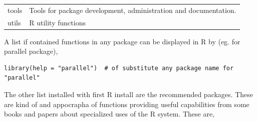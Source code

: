 \documentclass[]{book}
\theoremstyle{definition}
\theoremstyle{definition}
\theoremstyle{definition}
\theoremstyle{remark}
\begin{document}
\begin{longtable}[]{@{}ll@{}}
\begin{minipage}[t]{0.13\columnwidth}
tools\strut
\end{minipage} & \begin{minipage}[t]{0.81\columnwidth}\raggedright\strut
Tools for package development, administration and documentation.\strut
\end{minipage}\tabularnewline
\begin{minipage}[t]{0.13\columnwidth}\raggedright\strut
utils\strut
\end{minipage} & \begin{minipage}[t]{0.81\columnwidth}\raggedright\strut
R utility functions\strut
\end{minipage}\tabularnewline
\bottomrule
\end{longtable}

A list if contained functions in any package can be displayed in R by
(eg. for parallel package),

\begin{verbatim}
library(help = "parallel")  # of substitute any package name for "parallel"
\end{verbatim}

The other list installed with first R install are the recommended
packages. These are kind of and appocrapha of functions providing useful
capabilities from some books and papers about specialized uses of the R
system. These are,
\end{document}
